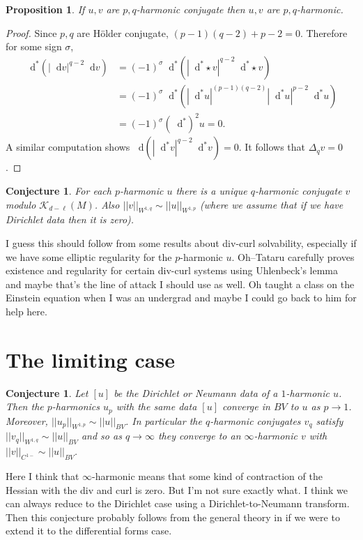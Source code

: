 \documentclass[reqno,10pt]{amsart}
\newcommand*\dif{\mathop{}\!\mathrm{d}}
\newtheorem{proposition}[theorem]{Proposition}
\newtheorem{conjecture}[theorem]{Conjecture}
\theoremstyle{definition}
\numberwithin{equation}{section}
\begin{document}
\begin{proposition}
If $u, v$ are $p, q$-harmonic conjugate then $u, v$ are $p, q$-harmonic.
\end{proposition}
\begin{proof}
Since $p, q$ are H\"older conjugate, $(p - 1)(q - 2) + p - 2 = 0$.
Therefore for some sign $\sigma$,
\begin{align*}
\dif^*(|\dif v|^{q - 2} \dif v) &= (-1)^\sigma \dif^*(|\dif^* \star v|^{q - 2} \dif^* \star v) \\
&= (-1)^\sigma \dif^* (|\dif^* u|^{(p - 1)(q - 2)} |\dif^* u|^{p - 2} \dif^* u) \\
&= (-1)^\sigma (\dif^*)^2 u = 0.
\end{align*}
A similar computation shows $\dif(|\dif^* v|^{q - 2} \dif^* v) = 0$.
It follows that $\Delta_q v = 0$.
\end{proof}

\begin{conjecture}
For each $p$-harmonic $u$ there is a unique $q$-harmonic conjugate $v$ modulo $\mathscr K_{d - \ell}(M)$.
Also $||v||_{W^{1, q}} \sim ||u||_{W^{1, p}}$ (where we assume that if we have Dirichlet data then it is zero).
\end{conjecture}

I guess this should follow from some results about div-curl solvability, especially if we have some elliptic regularity for the $p$-harmonic $u$.
Oh--Tataru \cite[Appendix A]{Oh:2017mdn} carefully proves existence and regularity for certain div-curl systems using Uhlenbeck's lemma and maybe that's the line of attack I should use as well.
Oh taught a class on the Einstein equation when I was an undergrad and maybe I could go back to him for help here.

\section{The limiting case}
\begin{conjecture}
Let $[u]$ be the Dirichlet or Neumann data of a $1$-harmonic $u$.
Then the $p$-harmonics $u_p$ with the same data $[u]$ converge in $BV$ to $u$ as $p \to 1$.
Moreover, $||u_p||_{W^{1, p}} \sim ||u||_{BV}$.
In particular the $q$-harmonic conjugates $v_q$ satisfy $||v_q||_{W^{1, q}} \sim ||u||_{BV}$ and so as $q \to \infty$ they converge to an $\infty$-harmonic $v$ with $||v||_{C^{1-}} \sim ||u||_{BV}$.
\end{conjecture}

Here I think that $\infty$-harmonic means that some kind of contraction of the Hessian with the div and curl is zero. But I'm not sure exactly what.
I think we can always reduce to the Dirichlet case using a Dirichlet-to-Neumann transform.
Then this conjecture probably follows from the general theory in \cite{Mazon14} if we were to extend it to the differential forms case.
\end{document}
